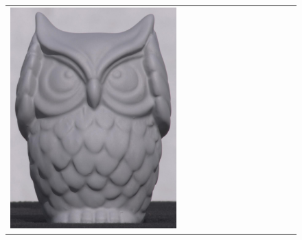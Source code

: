 \begin{figure}[!ht]
\begin{tabular}{@{}rcccccccccccc@{}}
    \includegraphics[width=\customwidth]{./figures/reconstruction/object/120346.jpg} &

\end{tabular}
\end{figure}
